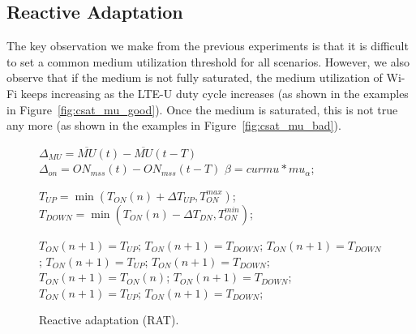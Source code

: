 \subsection{Reactive Adaptation}

The key observation we make from the previous experiments is that it is difficult to set a common medium utilization threshold for all scenarios. However, we also observe that if the medium is not fully saturated, the medium utilization of Wi-Fi keeps increasing as the LTE-U duty cycle increases (as shown in the examples in Figure~\ref{fig:csat_mu_good}). Once the medium is saturated, this is not true any more (as shown in the examples in Figure~\ref{fig:csat_mu_bad}). 



\begin{figure}[tbp]
\centering
\begin{minipage}{.45\textwidth}
  \centering
\begin{algorithmic}[1]
 {\small

        \State $\Delta_{MU} = \overline{MU}(t) - \overline{MU}(t-T)$
        \State $\Delta_{on} = {ON}_{mss}(t) - {ON}_{mss}(t-T)$
        \State $\beta = curmu * mu_{\alpha}$;
 
        \State $T_{UP} = \min ( T_{ON}(n) + \Delta T_{UP}, T^{max}_{ON})$;
        \State $T_{DOWN} = \min ( T_{ON}(n) - \Delta T_{DN}, T^{min}_{ON})$;

                    \label{rat:ups}
            \State $T_{ON}(n+1) = T_{UP}$;
             \label{rat:upd}
            \State $T_{ON}(n+1) = T_{DOWN}$;
          \Else
            \State $T_{ON}(n+1) = T_{DOWN}$;
          \EndIf                           \label{rat:upe}
                  \label{rat:eqs}
            \State $T_{ON}(n+1) = T_{UP}$;
              \label{rat:eqd}
            \State $T_{ON}(n+1) = T_{DOWN}$;
          \Else
            \State $T_{ON}(n+1) = T_{ON}(n)$;
          \EndIf                            \label{rat:eqe}
       \Else                                \label{rat:dns}
            \State $T_{ON}(n+1) = T_{DOWN}$;
            \State $T_{ON}(n+1) = T_{UP}$;
          \Else
            \State $T_{ON}(n+1) = T_{DOWN}$;
          \EndIf                            \label{rat:dne}
       \EndIf
	
	
\EndFunction
}
\end{algorithmic}
\end{minipage}
\caption{{Reactive adaptation (RAT).}} 
\label{fig:rat}
\vspace{-6pt}
\end{figure}

